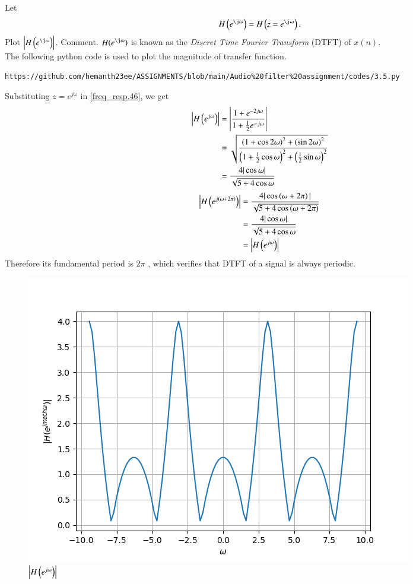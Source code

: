 \documentclass[journal,12pt,twocolumn]{IEEEtran}
\theoremstyle{remark}
\begin{document}
\begin{enumerate}[label=\thesection.\arabic*]
Let
\begin{equation}
H\brak{e^{\j \omega}} = H\brak{z = e^{\j \omega}}.
\end{equation}
Plot $\abs{H\brak{e^{\j \omega}}}$.  Comment.  $H(e^{\j \omega})$ is
known as the {\em Discret Time Fourier Transform} (DTFT) of $x(n)$.
\\
\solution The following python code is used to plot the magnitude of transfer function.
\begin{lstlisting}
https://github.com/hemanth23ee/ASSIGNMENTS/blob/main/Audio%20filter%20assignment/codes/3.5.py
\end{lstlisting}
Substituting $z = e^{j \omega}$ in \eqref{freq_resp.46}, we get
\begin{align}
	\left|H\left(e^{j\omega}\right)\right| &= \left|\frac{1 + e^{-2j\omega}}{1 + \frac{1}{2}e^{-j\omega}}\right| \\
									  &= \sqrt{\frac{\left(1 + \cos{2\omega}\right)^2 + \left(\sin{2\omega}\right)^2}{\left(1 + \frac{1}{2}\cos{\omega}\right)^2 + \left(\frac{1}{2}\sin{\omega}\right)^2}}\\
									  &= \frac{4|\cos{\omega}|}{\sqrt{5 + 4\cos{\omega}}}
\end{align}
\begin{align}
	\left|H\left(e^{j\left(\omega + 2\pi\right)}\right)\right| &= \frac{4|\cos\left(\omega + 2\pi\right)|}{\sqrt{5 + 4\cos\left(\omega + 2\pi\right)}} \\
											   &= \frac{4|\cos{\omega}|}{\sqrt{5 + 4\cos{\omega}}} \\
											   &= \left|H\left(e^{j\omega}\right)\right|	
\end{align}
Therefore its fundamental period is $2\pi$ , which verifies that DTFT of a signal is always periodic.

\begin{figure}[H]
\centering
\includegraphics[width=\columnwidth]{figs/H(z)_3.5.png}
\caption{$\left\vert H\left(e^{j\omega}\right)\right\vert$}
\label{H(z)_3.5.46}
\end{figure}
\end{enumerate}
\end{document}
